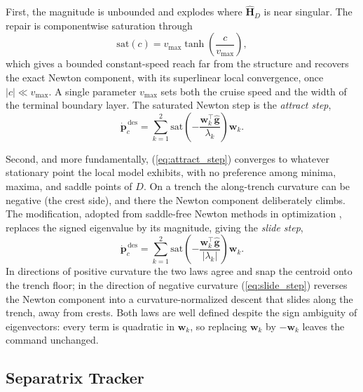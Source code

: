 \documentclass[lettersize,journal]{IEEEtran}
\begin{document}
First, the magnitude is unbounded and explodes where
$\hat{\mathbf{H}}_D$ is near singular. The repair is componentwise
saturation through
\begin{equation}
    \mathrm{sat}(c) = v_{\max} \tanh\!\left(\frac{c}{v_{\max}}\right),
    \label{eq:sat}
\end{equation}
which gives a bounded constant-speed reach far from the structure and
recovers the exact Newton component, with its superlinear local
convergence, once $|c| \ll v_{\max}$. A single parameter $v_{\max}$
sets both the cruise speed and the width of the terminal boundary
layer. The saturated Newton step is the \emph{attract step},
\begin{equation}
    \dot{\mathbf{p}}_c^{\,\text{des}} = \sum_{k=1}^{2}
    \mathrm{sat}\!\left(-\frac{\mathbf{w}_k^\top
    \hat{\mathbf{g}}}{\lambda_k}\right)\mathbf{w}_k.
    \label{eq:attract_step}
\end{equation}

Second, and more fundamentally, (\ref{eq:attract_step}) converges to
whatever stationary point the local model exhibits, with no preference
among minima, maxima, and saddle points of $D$. On a trench the
along-trench curvature can be negative (the crest side), and there the
Newton component deliberately climbs. The modification, adopted from
saddle-free Newton methods in optimization \cite{35}, replaces the signed
eigenvalue by its magnitude, giving the \emph{slide step},
\begin{equation}
    \dot{\mathbf{p}}_c^{\,\text{des}} = \sum_{k=1}^{2}
    \mathrm{sat}\!\left(-\frac{\mathbf{w}_k^\top
    \hat{\mathbf{g}}}{|\lambda_k|}\right)\mathbf{w}_k.
    \label{eq:slide_step}
\end{equation}
In directions of positive curvature the two laws agree and snap the
centroid onto the trench floor; in the direction of negative curvature
(\ref{eq:slide_step}) reverses the Newton component into a
curvature-normalized descent that slides along the trench, away from
crests. Both laws are well defined despite the sign ambiguity of
eigenvectors: every term is quadratic in $\mathbf{w}_k$, so replacing
$\mathbf{w}_k$ by $-\mathbf{w}_k$ leaves the command unchanged.

\subsection{Separatrix Tracker}
\label{sec:sep_controller}
\end{document}
